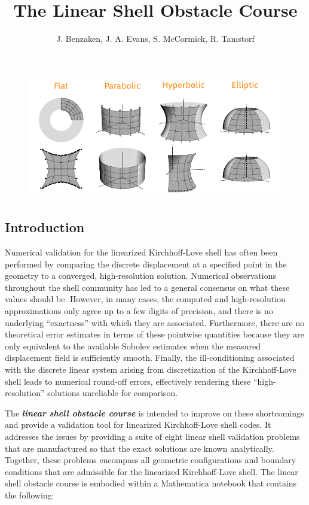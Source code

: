 \documentclass[10pt]{article}
\title{\normalfont The Linear Shell Obstacle Course}
\author{J. Benzaken, J. A. Evans, S. McCormick, R. Tamstorf}
\date{}
\numberwithin{equation}{section}
\begin{document}
\maketitle

\begin{figure}[h]
  \centering
  \includegraphics[width=\textwidth]{shells.pdf}
\end{figure}

\subsection*{Introduction}

Numerical validation for the linearized Kirchhoff-Love shell has often been performed by comparing the discrete displacement at a specified point in the geometry to a converged, high-resolution solution. Numerical observations throughout the shell community has led to a general consensus on what these values should be. However, in many cases, the computed and high-resolution approximations only agree up to a few digits of precision, and there is no underlying ``exactness'' with which they are associated. Furthermore, there are no theoretical error estimates in terms of these pointwise quantities because they are only equivalent to the available Sobolev estimates when the measured displacement field is sufficiently smooth. Finally, the ill-conditioning associated with the discrete linear system arising from discretization of the Kirchhoff-Love shell leads to numerical round-off errors, effectively rendering these ``high-resolution'' solutions unreliable for comparison.

The \textbf{\emph{linear shell obstacle course}} is intended to improve on these shortcomings and provide a validation tool for linearized Kirchhoff-Love shell codes. It addresses the issues by providing a suite of eight linear shell validation problems that are manufactured so that the exact solutions are known analytically. Together, these problems encompass all geometric configurations and boundary conditions that are admissible for the linearized Kirchhoff-Love shell. The linear shell obstacle course is embodied within a Mathematica notebook that contains the following:
\end{document}
